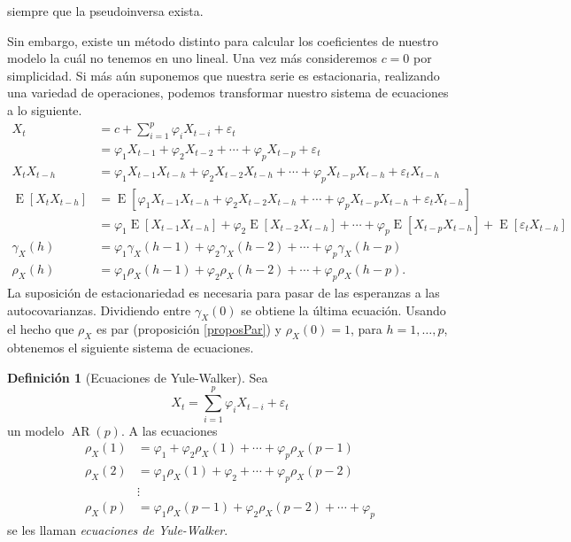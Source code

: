 \documentclass[11pt,letterpaper]{article}
\newcommand{\expected}{\ensuremath{\operatorname{E}}}
\newcommand{\AR}{\ensuremath{\operatorname{AR}}}
\theoremstyle{definition}
\newtheorem{definition}{Definición}[section]
\theoremstyle{theorem}
\theoremstyle{remark}
\begin{document}
	siempre que la pseudoinversa exista. \par
	Sin embargo, existe un método distinto para calcular los coeficientes de nuestro modelo la cuál no tenemos en uno lineal. Una vez más consideremos \(c=0\) por simplicidad. Si más aún suponemos que nuestra serie es estacionaria, realizando una variedad de operaciones, podemos transformar nuestro sistema de ecuaciones a lo siguiente.
	\begin{align*}
		X_t&=c+\sum_{i=1}^{p}\varphi_iX_{t-i}+\varepsilon_t \\
		&=\varphi_1X_{t-1}+\varphi_2X_{t-2}+\cdots+\varphi_pX_{t-p}+\varepsilon_t \\
		X_tX_{t-h}&=\varphi_1X_{t-1}X_{t-h}+\varphi_2X_{t-2}X_{t-h}+\cdots+\varphi_pX_{t-p}X_{t-h}+\varepsilon_tX_{t-h} \\
		\expected[X_tX_{t-h}]&=\expected[\varphi_1X_{t-1}X_{t-h}+\varphi_2X_{t-2}X_{t-h}+\cdots+\varphi_pX_{t-p}X_{t-h}+\varepsilon_tX_{t-h}] \\
		&=\varphi_1\expected[X_{t-1}X_{t-h}]+\varphi_2\expected[X_{t-2}X_{t-h}]+\cdots+\varphi_p\expected[X_{t-p}X_{t-h}]+\expected[\varepsilon_tX_{t-h}] \\
		\gamma_X(h)&=\varphi_1\gamma_X(h-1)+\varphi_2\gamma_X(h-2)+\cdots+\varphi_p\gamma_X(h-p) \\
		\rho_X(h)&=\varphi_1\rho_X(h-1)+\varphi_2\rho_X(h-2)+\cdots+\varphi_p\rho_X(h-p).
	\end{align*}
	La suposición de estacionariedad es necesaria para pasar de las esperanzas a las autocovarianzas. Dividiendo entre \(\gamma_X(0)\) se obtiene la última ecuación. Usando el hecho que \(\rho_X\) es par (proposición \ref{proposPar}) y \(\rho_X(0)=1\), para \(h=1,\dots,p\), obtenemos el siguiente sistema de ecuaciones.
	\begin{definition}[Ecuaciones de Yule-Walker]
		Sea \[X_t=\sum_{i=1}^{p}\varphi_iX_{t-i}+\varepsilon_t\] un modelo \(\AR(p)\). A las ecuaciones
		\begin{align*}
			\rho_X(1)&=\varphi_1+\varphi_2\rho_X(1)+\cdots+\varphi_p\rho_X(p-1) \\
			\rho_X(2)&=\varphi_1\rho_X(1)+\varphi_2+\cdots+\varphi_p\rho_X(p-2) \\
			&\vdots \\
			\rho_X(p)&=\varphi_1\rho_X(p-1)+\varphi_2\rho_X(p-2)+\cdots+\varphi_p
		\end{align*}
		se les llaman \textit{ecuaciones de Yule-Walker}.
	\end{definition}
\end{document}
